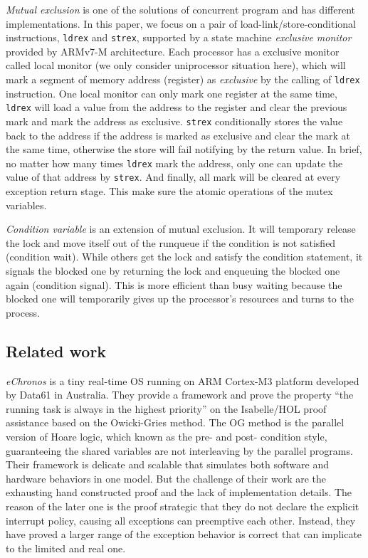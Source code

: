 \textit{Mutual exclusion} is one of the solutions of concurrent program and has different implementations. In this paper, we focus on a pair of load-link/store-conditional instructions, \texttt{ldrex} and \texttt{strex}, supported by a state machine \textit{exclusive monitor} provided by ARMv7-M architecture. Each processor has a exclusive monitor called local monitor (we only consider uniprocessor situation here), which will mark a segment of memory address (register) as \textit{exclusive} by the calling of \texttt{ldrex} instruction. One local monitor can only mark one register at the same time, \texttt{ldrex} will load a value from the address to the register and clear the previous mark and mark the address as exclusive. \texttt{strex} conditionally stores the value back to the address if the address is marked as exclusive and clear the mark at the same time, otherwise the store will fail notifying by the return value. In brief, no matter how many times \texttt{ldrex} mark the address, only one can update the value of that address by \texttt{strex}. And finally, all mark will be cleared at every exception return stage. This make sure the atomic operations of the mutex variables.

\textit{Condition variable} is an extension of mutual exclusion. It will temporary release the lock and move itself out of the runqueue if the condition is not satisfied (condition wait). While others get the lock and satisfy the condition statement, it signals the blocked one by returning the lock and enqueuing the blocked one again (condition signal). This is more efficient than busy waiting because the blocked one will temporarily gives up the processor's resources and turns to the process.

\subsection{Related work}
\textit{eChronos} \cite{DBLP:conf/itp/AndronickLMMR16} is a tiny real-time OS running on ARM Cortex-M3 platform developed by Data61 in Australia. They provide a framework and prove the property ``the running task is always in the highest priority'' on the Isabelle/HOL proof assistance based on the Owicki-Gries \cite{Owicki:1976:APT:2696887.2697004} method. The OG method is the parallel version of Hoare logic, which known as the pre- and post- condition style, guaranteeing the shared variables are not interleaving by the parallel programs. Their framework is delicate and scalable that simulates both software and hardware behaviors in one model. But the challenge of their work are the exhausting hand constructed proof and the lack of implementation details. The reason of the later one is the proof strategic that they do not declare the explicit interrupt policy, causing all exceptions can preemptive each other. Instead, they have proved a larger range of the exception behavior is correct that can implicate to the limited and real one.

